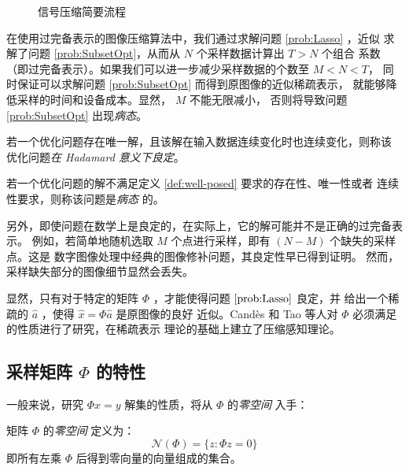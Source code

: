 \begin{figure}
\centering
{} %

\caption{信号压缩简要流程}
\label{Fig:Compress}
\end{figure}

在使用过完备表示的图像压缩算法中，我们通过求解问题 \ref{prob:Lasso} ，近似
求解了问题 \ref{prob:SubsetOpt}，从而从 $N$ 个采样数据计算出 $T > N$ 个组合
系数 （即过完备表示）。如果我们可以进一步减少采样数据的个数至 $M < N < T$，
同时保证可以求解问题 \ref{prob:SubsetOpt} 而得到原图像的近似稀疏表示，
就能够降低采样的时间和设备成本。显然， $M$ 不能无限减小，
否则将导致问题 \ref{prob:SubsetOpt} 出现\emph{病态}。
\begin{definition}[良定问题] \label{def:well-posed}
若一个优化问题存在唯一解，且该解在输入数据连续变化时也连续变化，则称该
优化问题\emph{在 Hadamard 意义下良定}。
\end{definition}
\begin{definition}[病态问题] \label{def:ill-posed}
若一个优化问题的解不满足定义 \ref{def:well-posed} 要求的存在性、唯一性或者
连续性要求，则称该问题是\emph{病态} 的。 \cite{MathProblemImage}
\end{definition}

另外，即使问题在数学上是良定的，在实际上，它的解可能并不是正确的过完备表示。
例如，若简单地随机选取 $M$ 个点进行采样，即有 $(N-M)$ 个缺失的采样点。这是
数字图像处理中经典的图像修补问题，其良定性早已得到证明。\cite{inpainting}
 然而，采样缺失部分的图像细节显然会丢失。

显然，只有对于特定的矩阵 $\Phi$ ，才能使得问题 $\ref{prob:Lasso}$ 良定，并
给出一个稀疏的 $\hat{a}$ ，使得 $\hat{x} = \Phi \hat{a}$ 是原图像的良好
近似。Cand\`es 和 Tao 等人对 $\Phi$ 必须满足的性质进行了研究，在稀疏表示
理论的基础上建立了压缩感知理论。

\subsection{采样矩阵 $\Phi$ 的特性}

一般来说，研究 $\Phi x = y$ 解集的性质，将从 $\Phi$ 的\emph{零空间} 入手：
\begin{definition}[零空间]
矩阵 $\Phi$ 的\emph{零空间} 定义为：
\begin{equation}
\mathcal{N}(\Phi) = \{z:\Phi z = 0\}
\end{equation}
即所有左乘 $\Phi$ 后得到零向量的向量组成的集合。
\end{definition}

